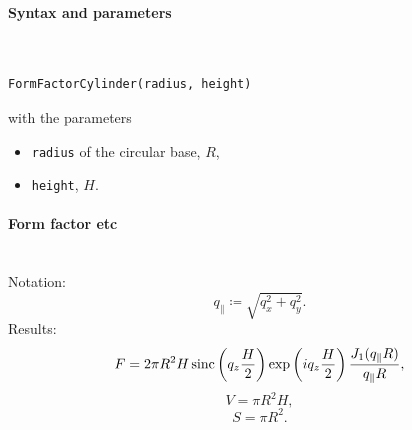 \paragraph{Syntax and parameters}\strut\\[-2ex plus .2ex minus .2ex]
\begin{lstlisting}[language=python, style=eclipseboxed,numbers=none,nolol]
  FormFactorCylinder(radius, height)
\end{lstlisting}
with the parameters
\begin{itemize}
\item \texttt{radius} of the circular base, $R$, 
\item \texttt{height}, $H$.
\end{itemize}


\paragraph{Form factor etc}\strut\\
Notation:
\begin{equation*}
  q_{\parallel} \coloneqq \sqrt{q_x^2+q_y^2}.
\end{equation*}
Results:
\begin{equation*}
  F=  2\pi R^2 H  \operatorname{sinc}\left(q_ z \frac{H}{2}\right) \exp\left(i q_ z \frac{H}{2}\right) 
    \frac{J_1(q_{\parallel} R )}{q_{\parallel} R },
\end{equation*}
\begin{equation*}
  V = \pi R^2 H,
\end{equation*}
\begin{equation*}
  S=\pi R^2.
\end{equation*}

